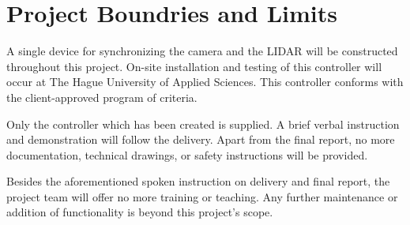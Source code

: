 \chapter{Project Boundries and Limits}

A single device for synchronizing the camera and the LIDAR will be constructed throughout this project. On-site installation and testing of this controller will occur at The Hague University of Applied Sciences. This controller conforms with the client-approved program of criteria. 

Only the controller which has been created is supplied. A brief verbal instruction and demonstration will follow the delivery. Apart from the final report, no more documentation, technical drawings, or safety instructions will be provided. 

Besides the aforementioned spoken instruction on delivery and final report, the project team will offer no more training or teaching. Any further maintenance or addition of functionality is beyond this project's scope.